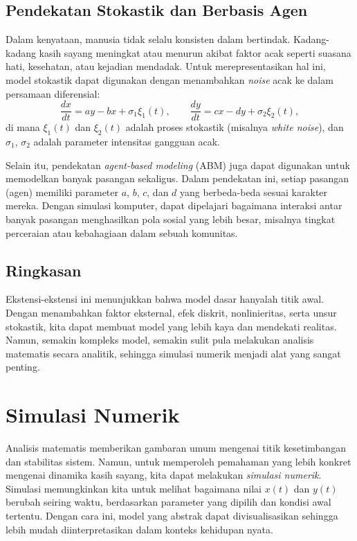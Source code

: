 \documentclass{bukumjh}
\begin{document}
\subsection*{Pendekatan Stokastik dan Berbasis Agen}
Dalam kenyataan, manusia tidak selalu konsisten dalam bertindak. 
Kadang-kadang kasih sayang meningkat atau menurun akibat faktor acak seperti suasana hati, kesehatan, atau kejadian mendadak. 
Untuk merepresentasikan hal ini, model stokastik dapat digunakan dengan menambahkan \emph{noise} acak ke dalam persamaan diferensial:
\[
\frac{dx}{dt} = a y - b x + \sigma_1 \xi_1(t), \qquad
\frac{dy}{dt} = c x - d y + \sigma_2 \xi_2(t),
\]
di mana $\xi_1(t)$ dan $\xi_2(t)$ adalah proses stokastik (misalnya \emph{white noise}), dan $\sigma_1$, $\sigma_2$ adalah parameter intensitas gangguan acak. 

Selain itu, pendekatan \emph{agent-based modeling} (ABM) juga dapat digunakan untuk memodelkan banyak pasangan sekaligus. 
Dalam pendekatan ini, setiap pasangan (agen) memiliki parameter $a$, $b$, $c$, dan $d$ yang berbeda-beda sesuai karakter mereka. 
Dengan simulasi komputer, dapat dipelajari bagaimana interaksi antar banyak pasangan menghasilkan pola sosial yang lebih besar, misalnya tingkat perceraian atau kebahagiaan dalam sebuah komunitas.

\subsection*{Ringkasan}
Ekstensi-ekstensi ini menunjukkan bahwa model dasar hanyalah titik awal. 
Dengan menambahkan faktor eksternal, efek diskrit, nonlinieritas, serta unsur stokastik, kita dapat membuat model yang lebih kaya dan mendekati realitas. 
Namun, semakin kompleks model, semakin sulit pula melakukan analisis matematis secara analitik, sehingga simulasi numerik menjadi alat yang sangat penting.

\section{Simulasi Numerik}

Analisis matematis memberikan gambaran umum mengenai titik kesetimbangan dan stabilitas sistem. 
Namun, untuk memperoleh pemahaman yang lebih konkret mengenai dinamika kasih sayang, kita dapat melakukan \emph{simulasi numerik}. 
Simulasi memungkinkan kita untuk melihat bagaimana nilai $x(t)$ dan $y(t)$ berubah seiring waktu, berdasarkan parameter yang dipilih dan kondisi awal tertentu. 
Dengan cara ini, model yang abstrak dapat divisualisasikan sehingga lebih mudah diinterpretasikan dalam konteks kehidupan nyata.
\end{document}
